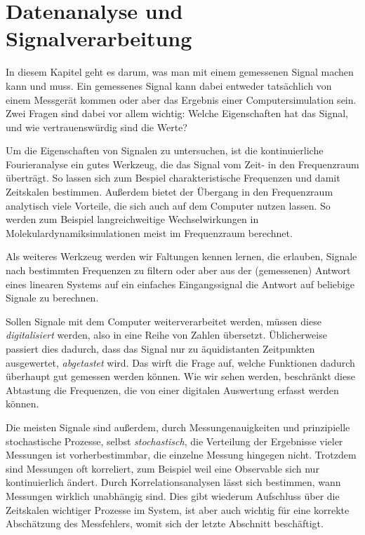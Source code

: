 % 


\chapter{Datenanalyse und Signalverarbeitung}

In diesem Kapitel geht es darum, was man mit einem gemessenen Signal
machen kann und muss. Ein gemessenes Signal kann dabei entweder
tatsächlich von einem Messgerät kommen oder aber das Ergebnis einer
Computersimulation sein. Zwei Fragen sind dabei vor allem wichtig:
Welche Eigenschaften hat das Signal, und wie vertrauenswürdig sind die
Werte?

Um die Eigenschaften von Signalen zu untersuchen, ist die
kontinuierliche Fourieranalyse ein gutes Werkzeug, die das Signal vom
Zeit- in den Frequenzraum überträgt. So lassen sich zum Bespiel
charakteristische Frequenzen und damit Zeitskalen bestimmen. Außerdem
bietet der Übergang in den Frequenzraum analytisch viele Vorteile, die
sich auch auf dem Computer nutzen lassen. So werden zum Beispiel
langreichweitige Wechselwirkungen in Molekulardynamiksimulationen
meist im Frequenzraum berechnet.

Als weiteres Werkzeug werden wir Faltungen kennen lernen, die
erlauben, Signale nach bestimmten Frequenzen zu filtern oder aber aus
der (gemessenen) Antwort eines linearen Systems auf ein einfaches
Eingangssignal die Antwort auf beliebige Signale zu berechnen.

Sollen Signale mit dem Computer weiterverarbeitet werden, müssen diese
\emph{digitalisiert} werden, also in eine Reihe von Zahlen
übersetzt. Üblicherweise passiert dies dadurch, dass das Signal nur zu
äquidistanten Zeitpunkten ausgewertet, \emph{abgetastet} wird. Das
wirft die Frage auf, welche Funktionen dadurch überhaupt gut gemessen
werden können. Wie wir sehen werden, beschränkt diese Abtastung die
Frequenzen, die von einer digitalen Auswertung erfasst werden können.

Die meisten Signale sind außerdem, durch Messungenauigkeiten und
prinzipielle stochastische Prozesse, selbst \emph{stochastisch},
\dh die Verteilung der Ergebnisse vieler Messungen ist
vorherbestimmbar, die einzelne Messung hingegen nicht. Trotzdem sind
Messungen oft korreliert, zum Beispiel weil eine Observable sich nur
kontinuierlich ändert.  Durch Korrelationsanalysen lässt sich
bestimmen, wann Messungen wirklich unabhängig sind. Dies gibt wiederum
Aufschluss über die Zeitskalen wichtiger Prozesse im System, ist aber
auch wichtig für eine korrekte Abschätzung des Messfehlers, womit sich
der letzte Abschnitt beschäftigt.

